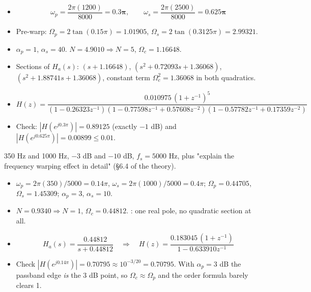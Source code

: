 \begin{itemize}
  \item[] \[ \omega_p=\frac{2\pi(1200)}{8000}=\mathbf{0.3\pi},\qquad
             \omega_s=\frac{2\pi(2500)}{8000}=\mathbf{0.625\pi} \]
  \item Pre-warp: $\Omega_p=2\tan(0.15\pi)=1.01905$,
        $\Omega_s=2\tan(0.3125\pi)=2.99321$.
  \item $\alpha_p=1$, $\alpha_s=40$. $N=4.9010\Rightarrow\boxed{N=5}$,
        $\Omega_c=1.16648$.
  \item Sections of $H_a(s)$: $(s+1.16648)$,
        $(s^2+0.72093s+1.36068)$, $(s^2+1.88741s+1.36068)$, constant term
        $\Omega_c^2=1.36068$ in both quadratics.
  \item[] \[ H(z)=\frac{0.010975\,(1+z^{-1})^5}
             {(1-0.26323z^{-1})(1-0.77598z^{-1}+0.57608z^{-2})
              (1-0.57782z^{-1}+0.17359z^{-2})} \]
  \item Check: $|H(e^{j0.3\pi})|=0.89125$ (exactly $-1$ dB) and
        $|H(e^{j0.625\pi})|=0.00899\le0.01$. \checkmark
\end{itemize}

{\color{sub}\footnotesize 350 Hz and 1000 Hz, $-3$ dB and $-10$ dB, $f_s=5000$ Hz, plus
"explain the frequency warping effect in detail" (\S6.4 of the theory).}
\begin{itemize}
  \item $\omega_p=2\pi(350)/5000=0.14\pi$, $\omega_s=2\pi(1000)/5000=0.4\pi$;
        $\Omega_p=0.44705$, $\Omega_s=1.45309$; $\alpha_p=3$, $\alpha_s=10$.
  \item $N=0.9340\Rightarrow\boxed{N=1}$, $\Omega_c=0.44812$. : one real pole, no quadratic section at all.
  \item[] \[ H_a(s)=\frac{0.44812}{s+0.44812}
             \quad\Longrightarrow\quad
             H(z)=\frac{0.183045\,(1+z^{-1})}{1-0.633910z^{-1}} \]
  \item Check $|H(e^{j0.14\pi})|=0.70795\approx10^{-3/20}=0.70795$. \checkmark
        With $\alpha_p=3$ dB the passband edge \emph{is} the 3 dB point, so
        $\Omega_c\approx\Omega_p$ and the order formula barely clears 1.
\end{itemize}

